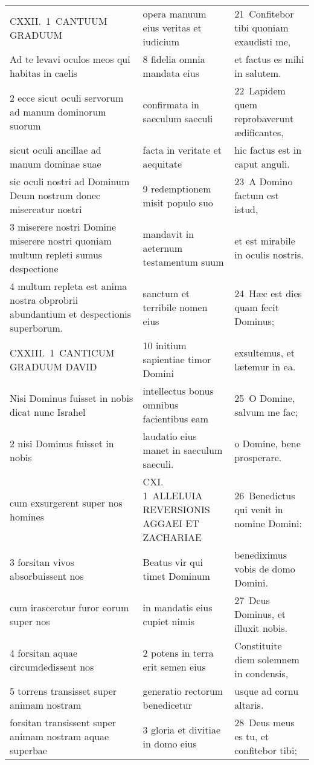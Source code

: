 \documentclass{article}
\begin{document}
\begin{longtable}{@{}p{}p{}p{}@{}}
CXXII. 1 CANTUUM GRADUUM	&	opera manuum eius veritas et iudicium	&	21 Confitebor tibi quoniam exaudisti me,	\\
Ad te levavi oculos meos qui habitas in caelis	&	8 fidelia omnia mandata eius	&	et factus es mihi in salutem.	\\
2 ecce sicut oculi servorum ad manum dominorum suorum	&	confirmata in saeculum saeculi	&	22 Lapidem quem reprobaverunt ædificantes,	\\
sicut oculi ancillae ad manum dominae suae	&	facta in veritate et aequitate	&	hic factus est in caput anguli.	\\
sic oculi nostri ad Dominum Deum nostrum donec misereatur nostri	&	9 redemptionem misit populo suo	&	23 A Domino factum est istud,	\\
3 miserere nostri Domine miserere nostri quoniam multum repleti sumus despectione	&	mandavit in aeternum testamentum suum	&	et est mirabile in oculis nostris.	\\
4 multum repleta est anima nostra obprobrii abundantium et despectionis superborum.	&	sanctum et terribile nomen eius	&	24 Hæc est dies quam fecit Dominus;	\\
CXXIII. 1 CANTICUM GRADUUM DAVID	&	10 initium sapientiae timor Domini	&	exsultemus, et lætemur in ea.	\\
Nisi Dominus fuisset in nobis dicat nunc Israhel	&	intellectus bonus omnibus facientibus eam	&	25 O Domine, salvum me fac;	\\
2 nisi Dominus fuisset in nobis	&	laudatio eius manet in saeculum saeculi.	&	o Domine, bene prosperare.	\\
cum exsurgerent super nos homines	&	CXI. 1 ALLELUIA REVERSIONIS AGGAEI ET ZACHARIAE	&	26 Benedictus qui venit in nomine Domini:	\\
3 forsitan vivos absorbuissent nos	&	Beatus vir qui timet Dominum	&	benediximus vobis de domo Domini.	\\
cum irasceretur furor eorum super nos	&	in mandatis eius cupiet nimis	&	27 Deus Dominus, et illuxit nobis.	\\
4 forsitan aquae circumdedissent nos	&	2 potens in terra erit semen eius	&	Constituite diem solemnem in condensis,	\\
5 torrens transisset super animam nostram	&	generatio rectorum benedicetur	&	usque ad cornu altaris.	\\
forsitan transissent super animam nostram aquae superbae	&	3 gloria et divitiae in domo eius	&	28 Deus meus es tu, et confitebor tibi;	\\

\end{longtable}
\end{document}
